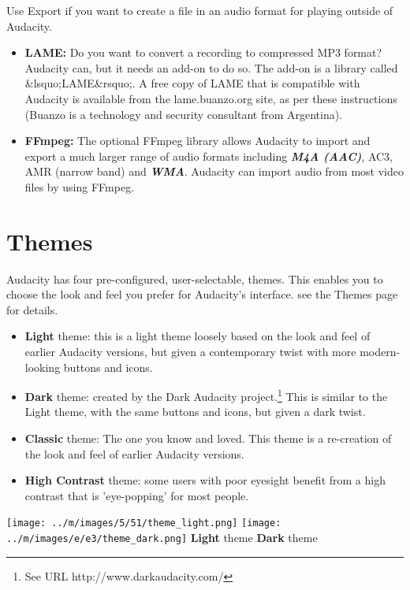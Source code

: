 \documentclass[twocolumn]{book}
\begin{document}
Use Export if you want to create a file in an audio format for playing outside of Audacity.
\begin{itemize}
\item  \textbf{LAME:} Do you want to convert a recording to compressed MP3 format? Audacity can, but it needs an add-on to do so.  The add-on is a library called \&lsquo;LAME\&rsquo;.  A free copy of LAME that is compatible with Audacity is available from the   lame.buanzo.org site, as per these instructions (Buanzo is a technology and security consultant from Argentina). 
\item  \textbf{FFmpeg:} The optional FFmpeg library allows Audacity to import and export a much larger range of audio formats including \textit{\textbf{M4A (AAC)}}, AC3, AMR (narrow band) and \textit{\textbf{WMA}}. Audacity can import audio from most video files by using FFmpeg.
\end{itemize}



\section{Themes}


Audacity has four pre-configured, user-selectable, themes.  This enables you to choose the look and feel you prefer for Audacity's interface. see the Themes page for details.
\begin{itemize}
\item \textbf{Light} theme: this is a light theme loosely based on the look and feel of earlier Audacity versions, but given a contemporary twist with more modern-looking buttons and icons. 
\item \textbf{Dark} theme: created by the Dark Audacity project.\footnote{See URL http://www.darkaudacity.com/} This is similar to the Light theme, with the same buttons and icons, but given a dark twist.
\item \textbf{Classic} theme: The one you know and loved. This theme is a re-creation of the look and feel of earlier Audacity versions. 
\item \textbf{High Contrast} theme: some users with poor eyesight benefit from a high contrast that is 'eye-popping' for most people.
\end{itemize}

\* \* \* \* \texttt{[image: ../m/images/5/51/theme\_light.png]}
\* \* \* \* \texttt{[image: ../m/images/e/e3/theme\_dark.png]}
\* \* \* \* 
\textbf{Light} theme
\* \* \* \* 
\textbf{Dark} theme
\end{document}
